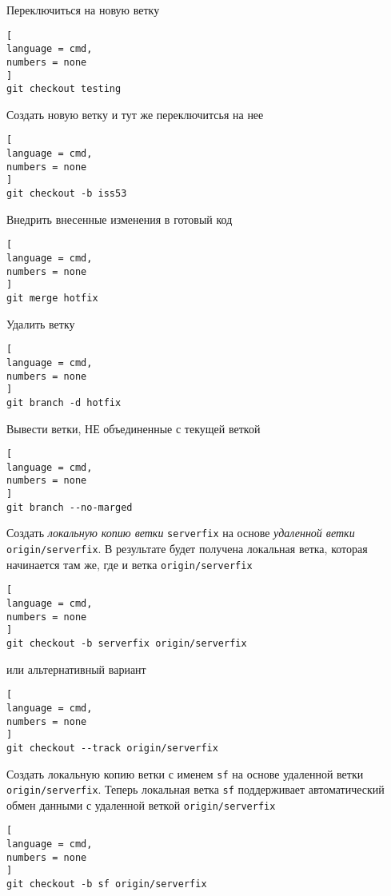 \documentclass[%
	11pt,
	a4paper,
	utf8,
		]{article}
\begin{document}
Переключиться на новую ветку

\begin{lstlisting}[
language = cmd,
numbers = none
]
git checkout testing
\end{lstlisting}

Создать новую ветку и тут же переключитсья на нее

\begin{lstlisting}[
language = cmd,
numbers = none
]
git checkout -b iss53
\end{lstlisting}


Внедрить внесенные изменения в готовый код

\begin{lstlisting}[
language = cmd,
numbers = none
]
git merge hotfix
\end{lstlisting}

Удалить ветку 

\begin{lstlisting}[
language = cmd,
numbers = none
]
git branch -d hotfix
\end{lstlisting}

Вывести ветки, НЕ объединенные с текущей веткой

\begin{lstlisting}[
language = cmd,
numbers = none
]
git branch --no-marged
\end{lstlisting}


Создать \emph{локальную копию ветки} \texttt{serverfix} на основе \emph{удаленной ветки} \texttt{origin/serverfix}. В результате будет получена локальная ветка, которая начинается там же, где и ветка \texttt{origin/serverfix}

\begin{lstlisting}[
language = cmd,
numbers = none
]
git checkout -b serverfix origin/serverfix
\end{lstlisting}

\noindent или альтернативный вариант

\begin{lstlisting}[
language = cmd,
numbers = none
]
git checkout --track origin/serverfix
\end{lstlisting}

Создать локальную копию ветки с именем \texttt{sf} на основе удаленной ветки \texttt{origin/serverfix}. Теперь локальная ветка \texttt{sf} поддерживает автоматический обмен данными с удаленной веткой \texttt{origin/serverfix}

\begin{lstlisting}[
language = cmd,
numbers = none
]
git checkout -b sf origin/serverfix
\end{lstlisting}
\end{document}
